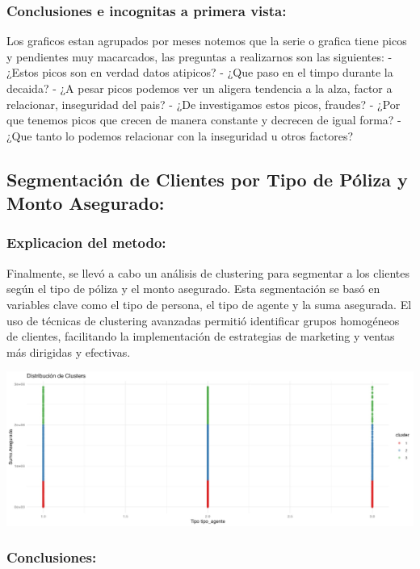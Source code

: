 \documentclass[
]{article}
\begin{document}
\subsubsection{Conclusiones e incognitas a primera
vista:}\label{conclusiones-e-incognitas-a-primera-vista-1}

Los graficos estan agrupados por meses notemos que la serie o grafica
tiene picos y pendientes muy macarcados, las preguntas a realizarnos son
las siguientes: -¿Estos picos son en verdad datos atipicos? - ¿Que paso
en el timpo durante la decaida? - ¿A pesar picos podemos ver un aligera
tendencia a la alza, factor a relacionar, inseguridad del pais? - ¿De
investigamos estos picos, fraudes? - ¿Por que tenemos picos que crecen
de manera constante y decrecen de igual forma? - ¿Que tanto lo podemos
relacionar con la inseguridad u otros factores?

\subsection{Segmentación de Clientes por Tipo de Póliza y Monto
Asegurado:}\label{segmentaciuxf3n-de-clientes-por-tipo-de-puxf3liza-y-monto-asegurado}

\subsubsection{Explicacion del metodo:}\label{explicacion-del-metodo-2}

Finalmente, se llevó a cabo un análisis de clustering para segmentar a
los clientes según el tipo de póliza y el monto asegurado. Esta
segmentación se basó en variables clave como el tipo de persona, el tipo
de agente y la suma asegurada. El uso de técnicas de clustering
avanzadas permitió identificar grupos homogéneos de clientes,
facilitando la implementación de estrategias de marketing y ventas más
dirigidas y efectivas.

\includegraphics{PHOTO-2024-06-13-15-13-05.jpg}

\subsubsection{Conclusiones:}\label{conclusiones}
\end{document}
